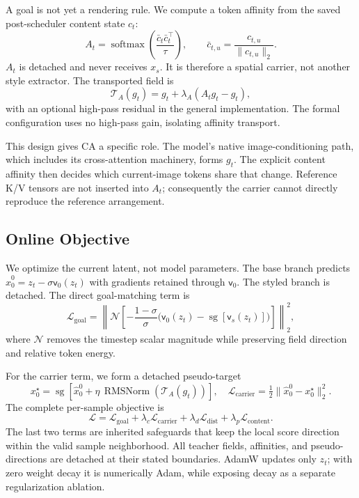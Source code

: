 \documentclass[10pt,letterpaper]{article}
\newcommand{\vel}{\mathsf{v}}
\newcommand{\sg}{\operatorname{sg}}
\begin{document}
A goal is not yet a rendering rule. We compute a token affinity from the saved
post-scheduler content state $c_t$:
\begin{equation}
 A_t=\operatorname{softmax}\!\left(\frac{\bar c_t\bar c_t^\top}{\tau}\right),
 \qquad \bar c_{t,u}=\frac{c_{t,u}}{\lVert c_{t,u}\rVert_2}.
 \label{eq:affinity}
\end{equation}
$A_t$ is detached and never receives $x_s$. It is therefore a spatial carrier,
not another style extractor. The transported field is
\begin{equation}
 \mathcal T_A(g_t)=g_t+\lambda_A(A_tg_t-g_t),
 \label{eq:transport}
\end{equation}
with an optional high-pass residual in the general implementation. The formal
configuration uses no high-pass gain, isolating affinity transport.

This design gives CA a specific role. The model's native image-conditioning
path, which includes its cross-attention machinery, forms $g_t$. The explicit
content affinity then decides which current-image tokens share that change.
Reference K/V tensors are not inserted into $A_t$; consequently the carrier
cannot directly reproduce the reference arrangement.

\subsection{Online Objective}

We optimize the current latent, not model parameters. The base branch predicts
$\hat x_0^0=z_t-\sigma\vel_0(z_t)$ with gradients retained through
$\vel_0$. The styled branch is detached. The direct goal-matching term is
\begin{equation}
 \mathcal L_{\mathrm{goal}}
 =\left\lVert\mathcal N\!\left[
 -\frac{1-\sigma}{\sigma}
 \big(\vel_0(z_t)-\sg[\vel_s(z_t)]\big)
 \right]\right\rVert_2^2,
 \label{eq:lgoal}
\end{equation}
where $\mathcal N$ removes the timestep scalar magnitude while preserving field
direction and relative token energy.

For the carrier term, we form a detached pseudo-target
\begin{equation}
 x_0^\star=\sg\left[\hat x_0^0+
 \eta\,\operatorname{RMSNorm}(\mathcal T_A(g_t))\right],
 \quad
 \mathcal L_{\mathrm{carrier}}=\tfrac12
 \lVert\hat x_0^0-x_0^\star\rVert_2^2.
 \label{eq:carrierloss}
\end{equation}
The complete per-sample objective is
\begin{equation}
 \mathcal L=\mathcal L_{\mathrm{goal}}
 +\lambda_c\mathcal L_{\mathrm{carrier}}
 +\lambda_d\mathcal L_{\mathrm{dist}}
 +\lambda_p\mathcal L_{\mathrm{content}}.
 \label{eq:full}
\end{equation}
The last two terms are inherited safeguards that keep the local score direction
within the valid sample neighborhood. All teacher fields, affinities, and
pseudo-directions are detached at their stated boundaries. AdamW updates only
$z_t$; with zero weight decay it is numerically Adam, while exposing decay as a
separate regularization ablation.
\end{document}
